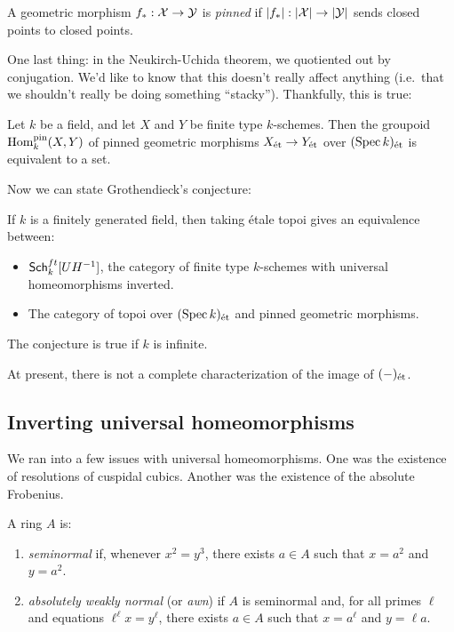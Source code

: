 \documentclass{amsart}
\begin{document}
\begin{dfn}
	A geometric morphism $f_*: \mathcal{X} \to \mathcal{Y}$ is \emph{pinned} if $\left|{f_*}\right|: \left|{\mathcal{X}}\right| \to \left|{\mathcal{Y}}\right|$ sends closed points to closed points.
\end{dfn}

One last thing: in the Neukirch-Uchida theorem, we quotiented out by conjugation.
We'd like to know that this doesn't really affect anything (i.e.\ that we shouldn't really be doing something ``stacky'').
Thankfully, this is true:

\begin{prop}
	Let $k$ be a field, and let $X$ and $Y$ be finite type $k$-schemes.
	Then the groupoid $\operatorname{Hom}_k^{\mathrm{pin}}(X, Y)$ of pinned geometric morphisms $X_{\mathrm{\acute{e}t}} \to Y_{\mathrm{\acute{e}t}}$ over $(\operatorname{Spec} k)_{\mathrm{\acute{e}t}}$ is equivalent to a set.
\end{prop}

Now we can state Grothendieck's conjecture:

\begin{conj}[Grothendieck 1983]
	If $k$ is a finitely generated field, then taking \'etale topoi gives an equivalence between:
	\begin{itemize}
		\item $\mathsf{Sch}_k^{ft}[UH^{-1}]$, the category of finite type $k$-schemes with universal homeomorphisms inverted.
		\item The category of topoi over $(\operatorname{Spec} k)_{\mathrm{\acute{e}t}}$ and pinned geometric morphisms.
	\end{itemize}
\end{conj}

\begin{thm}[CHW]
	The conjecture is true if $k$ is infinite.
\end{thm}

At present, there is not a complete characterization of the image of $(-)_{\mathrm{\acute{e}t}}$.

\subsection{Inverting universal homeomorphisms}

We ran into a few issues with universal homeomorphisms.
One was the existence of resolutions of cuspidal cubics.
Another was the existence of the absolute Frobenius.

\begin{dfn}
	A ring $A$ is:
	\begin{enumerate}
		\item \emph{seminormal} if, whenever $x^2 = y^3$, there exists $a \in A$ such that $x = a^2$ and $y = a^2$.
		\item \emph{absolutely weakly normal} (or \emph{awn}) if $A$ is seminormal and, for all primes $\ell$ and equations $\ell^\ell x = y^\ell$, there exists $a \in A$ such that $x = a^\ell$ and $y = \ell a$.
	\end{enumerate}
\end{dfn}
\end{document}
